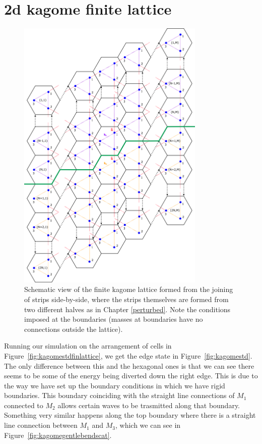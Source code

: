 \section{2d kagome finite lattice}
\begin{figure}[!h]
\centering
\includegraphics[width=0.8\textwidth]{imgs/kagomefinitemodel.png}
\caption{\label{fig:kagomefinscheme} Schematic view of the finite kagome
  lattice formed from the joining of strips side-by-side, where the strips
  themselves are formed from two different halves as in Chapter
  \ref{perturbed}. Note the conditions imposed at the boundaries (masses at
  boundaries have no connections outside the lattice).}
\end{figure}

Running our simulation on the arrangement of cells in
Figure~\ref{fig:kagomestdfinlattice}, we get the edge state in
Figure~\ref{fig:kagomestd}. The only difference between this and the hexagonal
ones is that we can see there seems to be some of the energy being
diverted down the right edge. This is due to the way we have set up the
boundary conditions in which we have rigid boundaries. This boundary coinciding
with the straight line connections of $M_1$ connected to $M_2$ allows certain
waves to be trasmitted along that boundary. Something very similar happens
along the top boundary where there is a straight line connection between $M_1$
and $M_3$, which we can see in Figure~\ref{fig:kagomegentlebendscat}.

